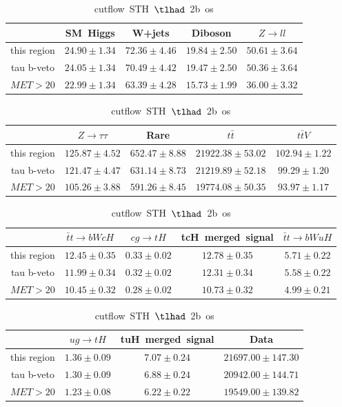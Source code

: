 \begin{table}
\footnotesize
\caption{cutflow~STH~$\tlhad$~2b~os}
\centering
\begin{tabular}{|c|c|c|c|c|} \hline
 & SM~Higgs & W+jets & Diboson & $Z\to ll$\\\hline
this region & $24.90\pm1.34$ & $72.36\pm4.46$ & $19.84\pm2.50$ & $50.61\pm3.64$\\\hline
tau b-veto & $24.05\pm1.34$ & $70.49\pm4.42$ & $19.47\pm2.50$ & $50.36\pm3.64$\\\hline
$MET>20$ & $22.99\pm1.34$ & $63.39\pm4.28$ & $15.73\pm1.99$ & $36.00\pm3.32$\\\hline
\end{tabular}
\begin{tabular}{|c|c|c|c|c|} \hline
 & $Z\to \tau\tau$ & Rare & $t\bar{t}$ & $t\bar{t}V$\\\hline
this region & $125.87\pm4.52$ & $652.47\pm8.88$ & $21922.38\pm53.02$ & $102.94\pm1.22$\\\hline
tau b-veto & $121.47\pm4.47$ & $631.14\pm8.73$ & $21219.89\pm52.18$ & $99.29\pm1.20$\\\hline
$MET>20$ & $105.26\pm3.88$ & $591.26\pm8.45$ & $19774.08\pm50.35$ & $93.97\pm1.17$\\\hline
\end{tabular}
\begin{tabular}{|c|c|c|c|c|} \hline
 & $\bar{t}t\to bWcH$ & $cg\to tH$ & tcH~merged~signal & $\bar{t}t\to bWuH$\\\hline
this region & $12.45\pm0.35$ & $0.33\pm0.02$ & $12.78\pm0.35$ & $5.71\pm0.22$\\\hline
tau b-veto & $11.99\pm0.34$ & $0.32\pm0.02$ & $12.31\pm0.34$ & $5.58\pm0.22$\\\hline
$MET>20$ & $10.45\pm0.32$ & $0.28\pm0.02$ & $10.73\pm0.32$ & $4.99\pm0.21$\\\hline
\end{tabular}
\begin{tabular}{|c|c|c|c|} \hline
 & $ug\to tH$ & tuH~merged~signal & Data\\\hline
this region & $1.36\pm0.09$ & $7.07\pm0.24$ & $21697.00\pm147.30$\\\hline
tau b-veto & $1.30\pm0.09$ & $6.88\pm0.24$ & $20942.00\pm144.71$\\\hline
$MET>20$ & $1.23\pm0.08$ & $6.22\pm0.22$ & $19549.00\pm139.82$\\\hline
\end{tabular}
\label{tab:cutflow_reg1l1tau2b2j_os}
\end{table}
